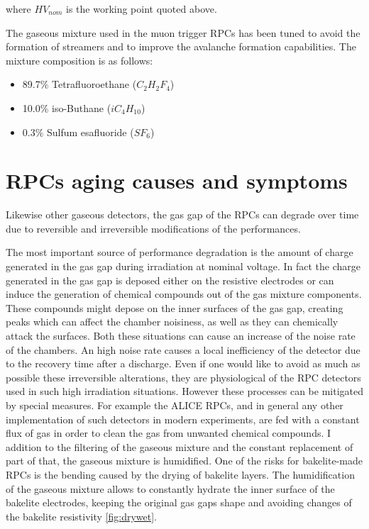 where $HV_{nom}$ is the working point quoted above.


The gaseous mixture used in the muon trigger RPCs has been tuned to avoid the formation of streamers and to improve the avalanche formation capabilities.
The mixture composition is as follows:
\begin{itemize}
\item 89.7\% Tetrafluoroethane ($C_2H_2F_4$)
\item 10.0\% iso-Buthane ($iC_4H_{10}$)
\item 0.3\% Sulfum esafluoride ($SF_6$)
\end{itemize}

\section{RPCs aging causes and symptoms}
Likewise other gaseous detectors, the gas gap of the RPCs can degrade over time due to reversible and irreversible modifications of the performances.

The most important source of performance degradation is the amount of charge generated in the gas gap during irradiation at nominal voltage.
In fact the charge generated in the gas gap is deposed either on the resistive electrodes or can induce the generation of chemical compounds out of the gas mixture components.
These compounds might depose on the inner surfaces of the gas gap, creating peaks which can affect the chamber noisiness, as well as they can chemically attack the surfaces.
Both these situations can cause an increase of the noise rate of the chambers.
An high noise rate causes a local inefficiency of the detector due to the recovery time after a discharge.
Even if one would like to avoid as much as possible these irreversible alterations, they are physiological of the RPC detectors used in such high irradiation situations.
However these processes can be mitigated by special measures.
For example the ALICE RPCs, and in general any other implementation of such detectors in modern experiments, are fed with a constant flux of gas in order to clean the gas from unwanted chemical compounds.
I addition to the filtering of the gaseous mixture and the constant replacement of part of that, the gaseous mixture is humidified.
One of the risks for bakelite-made RPCs is the bending caused by the drying of bakelite layers.
The humidification of the gaseous mixture allows to constantly hydrate the inner surface of the bakelite electrodes, keeping the original gas gaps shape and avoiding changes of the bakelite resistivity \ref{fig:drywet}.

